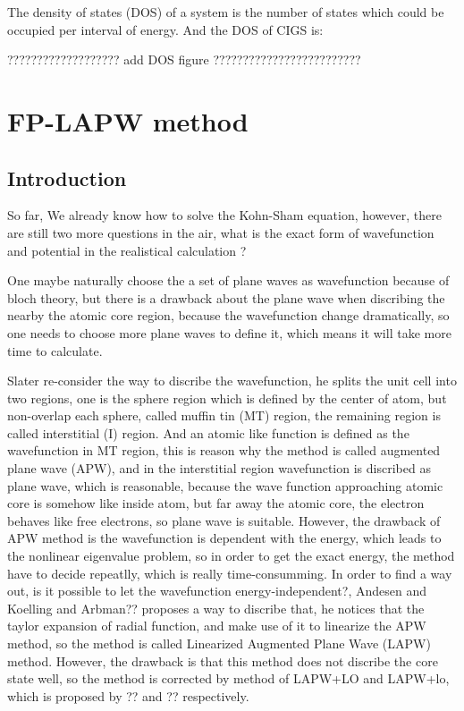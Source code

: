 \documentclass[a4paper]{report}
\begin{document}
\noindent The density of states (DOS) of a system is the number of states which could be occupied per interval of energy. And the DOS of CIGS is: 

{\color{red}??????????????????? add DOS figure ?????????????????????????} 





\chapter{FP-LAPW method}
\section{Introduction}
\noindent So far, We already know how to solve the Kohn-Sham equation, however, there are still two more questions in the air, what is the exact form of 
wavefunction and potential in the realistical calculation ?  

\noindent One maybe naturally choose the a set of plane waves as wavefunction because of bloch theory, but there is a drawback about the plane wave 
when discribing the nearby the atomic core region, because the wavefunction change dramatically, so one needs to choose more plane
waves to define it, which means it will take more time to calculate.

\noindent Slater re-consider the way to discribe the wavefunction, he splits the unit cell into two regions, one is the sphere region which is
defined by the center of atom, but non-overlap each sphere, called muffin tin (MT) region, the remaining region is called interstitial 
(I) region. And an atomic like function is defined as the wavefunction in MT region, this is reason why the method is called augmented plane wave (APW),
 and in the interstitial region wavefunction is discribed as plane wave, which is reasonable, because the wave 
function approaching atomic core is somehow like inside atom, but far away the atomic core, the electron behaves like free electrons,
 so plane wave is suitable. However, the drawback of APW method is the wavefunction is dependent with the energy, which leads to the 
nonlinear eigenvalue problem, so in order to get the exact energy, the method have to decide repeatlly, which is really time-consumming.
\noindent In order to find a way out, is it possible to let the wavefunction energy-independent?, Andesen and Koelling and Arbman?? proposes a way to discribe that, he notices that
the taylor expansion of radial function, and make use of it to linearize the APW method, so the method is called Linearized Augmented Plane Wave (LAPW) method.
However, the drawback is that this method does not discribe the core state well, so the method is corrected by method of LAPW+LO and LAPW+lo, which is proposed by ?? and ?? respectively.
\end{document}

